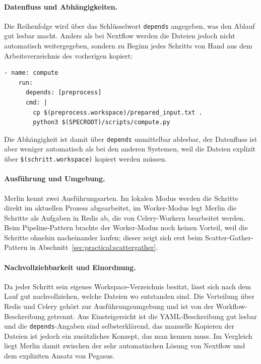 \paragraph{Datenfluss und Abhängigkeiten.}
Die Reihenfolge wird über das Schlüsselwort \texttt{depends} angegeben, was den Ablauf gut lesbar
macht. Anders als bei Nextflow werden die Dateien jedoch nicht automatisch weitergegeben, sondern
zu Beginn jedes Schritts von Hand aus dem Arbeitsverzeichnis des vorherigen kopiert:

\begin{lstlisting}[caption={depends und manuelles Kopieren (Merlin, Pipeline)},label={lst:pipe:me:depends}]
  - name: compute
    run:
      depends: [preprocess]
      cmd: |
        cp $(preprocess.workspace)/prepared_input.txt .
        python3 $(SPECROOT)/scripts/compute.py
\end{lstlisting}

Die Abhängigkeit ist damit über \texttt{depends} unmittelbar ablesbar, der Datenfluss ist aber
weniger automatisch als bei den anderen Systemen, weil die Dateien explizit über
\texttt{\$(schritt.workspace)} kopiert werden müssen.

\paragraph{Ausführung und Umgebung.}
Merlin kennt zwei Ausführungsarten. Im lokalen Modus werden die Schritte direkt im aktuellen
Prozess abgearbeitet, im Worker-Modus legt Merlin die Schritte als Aufgaben in Redis ab, die von
Celery-Workern bearbeitet werden. Beim Pipeline-Pattern brachte der Worker-Modus noch keinen
Vorteil, weil die Schritte ohnehin nacheinander laufen; dieser zeigt sich erst beim
Scatter-Gather-Pattern in Abschnitt~\ref{sec:practical:scattergather}.

\paragraph{Nachvollziehbarkeit und Einordnung.}
Da jeder Schritt sein eigenes Workspace-Verzeichnis besitzt, lässt sich nach dem Lauf gut
nachvollziehen, welche Dateien wo entstanden sind. Die Verteilung über Redis und Celery gehört zur
Ausführungsumgebung und ist von der Workflow-Beschreibung getrennt. Aus Einsteigersicht ist die
YAML-Beschreibung gut lesbar und die \texttt{depends}-Angaben sind selbsterklärend, das manuelle
Kopieren der Dateien ist jedoch ein zusätzliches Konzept, das man kennen muss. Im Vergleich liegt
Merlin damit zwischen der sehr automatischen Lösung von Nextflow und dem expliziten Ansatz von
Pegasus.

